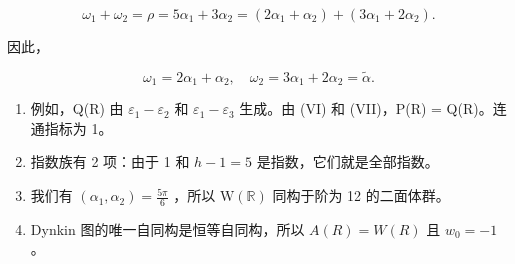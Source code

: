\[
\omega_ {1} + \omega_ {2} = \rho = 5 \alpha_ {1} + 3 \alpha_ {2} = (2 \alpha_ {1} + \alpha_ {2}) + (3 \alpha_ {1} + 2 \alpha_ {2}).
\]

因此，

\[
\omega_ {1} = 2 \alpha_ {1} + \alpha_ {2}, \quad \omega_ {2} = 3 \alpha_ {1} + 2 \alpha_ {2} = \tilde {\alpha}.
\]

\begin{enumerate}
\def\labelenumi{(\Roman{enumi})}
\setcounter{enumi}{7}
\item
  例如，Q(R) 由 \(\varepsilon_{1}-\varepsilon_{2}\) 和 \(\varepsilon_{1}-\varepsilon_{3}\) 生成。由 (VI) 和 (VII)，P(R) = Q(R)。连通指标为 1。
\item
  指数族有 2 项：由于 1 和 \(h - 1 = 5\) 是指数，它们就是全部指数。
\item
  我们有 \((\alpha_{1},\alpha_{2}) = \frac{5\pi}{6}\) ，所以 \(\mathrm{W}(\mathbb{R})\) 同构于阶为 12 的二面体群。
\item
  Dynkin 图的唯一自同构是恒等自同构，所以 \(A(R) = W(R)\) 且 \(w_{0} = -1\) 。
\end{enumerate}

